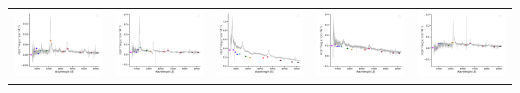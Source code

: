 \begin{center}
\begin{longtable}{l l l l l }
    \includegraphics[width=0.19\linewidth, clip]{Figs/Figs-sdss/spec-4240-55455-0669-STRIPE82-0058-035027.pdf} & \includegraphics[width=0.19\linewidth, clip]{Figs/Figs-sdss/spec-4241-55450-0894-STRIPE82-0062-010390.pdf} & \includegraphics[width=0.19\linewidth, clip]{Figs/Figs-sdss/spec-4302-55531-0350-STRIPE82-0012-042042.pdf} & \includegraphics[width=0.19\linewidth, clip]{Figs/Figs-sdss/spec-4344-55557-0830-STRIPE82-0055-005329.pdf} & \includegraphics[width=0.19\linewidth, clip]{Figs/Figs-sdss/spec-4374-55883-0621-SPLUS-s02s02-030289.pdf} \\

\end{longtable}
\end{center}
